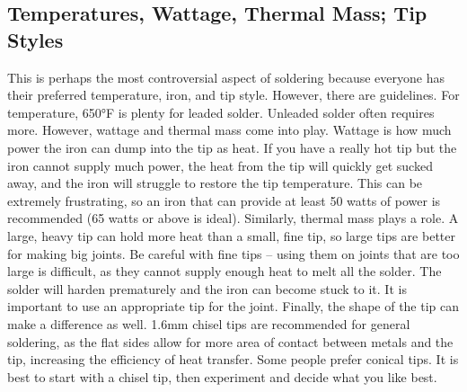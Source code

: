 \subsection{Temperatures, Wattage, Thermal Mass; Tip Styles}
This is perhaps the most controversial aspect of soldering because everyone has their preferred temperature, iron, and tip style. However, there are guidelines. For temperature, 650°F is plenty for leaded solder. Unleaded solder often requires more. However, wattage and thermal mass come into play. Wattage is how much power the iron can dump into the tip as heat. If you have a really hot tip but the iron cannot supply much power, the heat from the tip will quickly get sucked away, and the iron will struggle to restore the tip temperature. This can be extremely frustrating, so an iron that can provide at least 50 watts of power is recommended (65 watts or above is ideal). Similarly, thermal mass plays a role. A large, heavy tip can hold more heat than a small, fine tip, so large tips are better for making big joints. Be careful with fine tips – using them on joints that are too large is difficult, as they cannot supply enough heat to melt all the solder. The solder will harden prematurely and the iron can become stuck to it. It is important to use an appropriate tip for the joint. Finally, the shape of the tip can make a difference as well. 1.6mm chisel tips are recommended for general soldering, as the flat sides allow for more area of contact between metals and the tip, increasing the efficiency of heat transfer. Some people prefer conical tips. It is best to start with a chisel tip, then experiment and decide what you like best.
